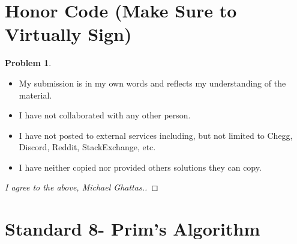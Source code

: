 \documentclass[11pt]{article}
\theoremstyle{definition}
\theoremstyle{definition}
\newtheorem{required}{Problem}
\theoremstyle{definition}
\begin{document}
\section{Honor Code (Make Sure to Virtually Sign)} \label{HonorCode}

\begin{required}
\noindent 
\begin{itemize}
\item My submission is in my own words and reflects my understanding of the material.
\item I have not collaborated with any other person.
\item I have not posted to external services including, but not limited to Chegg, Discord, Reddit, StackExchange, etc.
\item I have neither copied nor provided others solutions they can copy.
\end{itemize}

\end{required}

\begin{proof}[I agree to the above, Michael Ghattas.]
\end{proof}


\newpage
\section{Standard 8- Prim's Algorithm}
\end{document}
